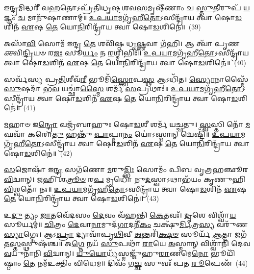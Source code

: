 {\anuvakamend[{𑌆 𑌤𑌿᳴\-\ul{𑌷𑍍𑌠} 𑌷𑌡𑍍𑌵𑌿𑍞᳴𑌶𑌤𑌿𑌃}]}%

𑌇\-\ul{𑌨𑍍𑌦𑍍𑌰}\-𑌮𑌿𑌦𑍍𑌧𑌰𑍀᳴ 𑌵\-\ul{𑌹}\-𑌤𑍋\-𑌽𑌪𑍍𑌰᳴𑌤𑌿𑌧𑍃𑌷𑍍𑌟𑌶𑌵\-\ul{𑌸}\-𑌮𑍃𑌷𑍀᳴𑌣𑌾𑌂 𑌚 \ul{𑌸𑍍𑌤𑍁}\-𑌤𑍀𑌰𑍁𑌪᳴ \ul{𑌯}\-𑌜𑍍𑌞𑌂 \ul{𑌚} 𑌮𑌾𑌨𑍁᳴𑌷𑌾𑌣𑌾𑌮𑍍॥ \ul{𑌉}\-\-\ul{𑌪}\-\-\ul{𑌯𑌾}\-𑌮𑌗𑍃᳴𑌹𑍀\-\ul{𑌤𑍋}\-\-𑌽𑌸𑍀𑌨𑍍𑌦𑍍𑌰𑌾᳴𑌯 𑌤𑍍𑌵𑌾 𑌷𑍋\-\ul{𑌡}\-𑌶𑌿𑌨᳴ \ul{𑌏}\-𑌷 \ul{𑌤𑍇} 𑌯𑍋\-\ul{𑌨𑌿}\-𑌰𑌿𑌨𑍍𑌦𑍍𑌰𑌾᳴𑌯 𑌤𑍍𑌵𑌾 𑌷𑍋\-\ul{𑌡}\-𑌶𑌿𑌨𑍇॑॥~(39)

{\anuvakamend[{𑌇\-\ul{𑌨𑍍𑌦𑍍𑌰}\-𑌮𑌿𑌤𑍍𑌤𑍍𑌰𑌯𑍋᳴𑌵𑌿𑍞𑌶𑌤𑌿𑌃}]}%

𑌅𑌸𑌾᳴\-\ul{𑌵𑌿} 𑌸𑍋𑌮᳴ 𑌇𑌨𑍍𑌦𑍍𑌰 \ul{𑌤𑍇} 𑌶𑌵𑌿᳴𑌷𑍍𑌠 𑌧𑍃\-\ul{𑌷𑍍𑌣}\-𑌵𑌾 𑌗᳴𑌹𑌿। 𑌆 𑌤𑍍𑌵𑌾᳴ 𑌪𑍃𑌣𑌕𑍍𑌤𑍍𑌵𑌿\-\ul{𑌨𑍍𑌦𑍍𑌰𑌿}\-𑌯𑍞 𑌰\-\ul{𑌜𑌃} 𑌸𑍂\-\ul{𑌰𑍍𑌯𑌂} 𑌨 \ul{𑌰}\-𑌶𑍍𑌮𑌿𑌭𑌿𑌃᳴॥ \ul{𑌉}\-\-\ul{𑌪}\-\-\ul{𑌯𑌾}\-𑌮𑌗𑍃᳴𑌹𑍀\-\ul{𑌤𑍋}\-\-𑌽𑌸𑍀𑌨𑍍𑌦𑍍𑌰𑌾᳴𑌯 𑌤𑍍𑌵𑌾 𑌷𑍋\-\ul{𑌡}\-𑌶𑌿𑌨᳴ \ul{𑌏}\-𑌷 \ul{𑌤𑍇} 𑌯𑍋\-\ul{𑌨𑌿}\-𑌰𑌿𑌨𑍍𑌦𑍍𑌰𑌾᳴𑌯 𑌤𑍍𑌵𑌾 𑌷𑍋\-\ul{𑌡}\-𑌶𑌿𑌨𑍇॑॥~(40)

{\anuvakamend[{𑌅𑌸𑌾᳴𑌵𑌿 \ul{𑌸}\-𑌪𑍍𑌤𑌵𑌿𑍞᳴𑌶𑌤𑌿𑌃}]}%

𑌸𑌰𑍍𑌵᳴𑌸𑍍𑌯 𑌪𑍍𑌰\-\ul{𑌤𑌿}\-𑌶𑍀𑌵᳴\-\ul{𑌰𑍀} 𑌭𑍂𑌮𑌿᳴\-\ul{𑌸𑍍𑌤𑍍𑌵𑍋}\-𑌪\-\ul{𑌸𑍍𑌥} 𑌆\-𑌽𑌧𑌿᳴𑌤। \ul{𑌸𑍍𑌯𑍋}\-𑌨𑌾𑌸𑍍𑌮𑍈᳴ \ul{𑌸𑍁}\-𑌷𑌦𑌾᳴ 𑌭\-\ul{𑌵} 𑌯𑌚𑍍𑌛𑌾॑\-\ul{𑌸𑍍𑌮𑍈} 𑌶𑌰𑍍𑌮᳴ \ul{𑌸}\-𑌪𑍍𑌰𑌥𑌾𑌃॑॥ \ul{𑌉}\-\-\ul{𑌪}\-\-\ul{𑌯𑌾}\-𑌮𑌗𑍃᳴𑌹𑍀\-\ul{𑌤𑍋}\-\-𑌽𑌸𑍀𑌨𑍍𑌦𑍍𑌰𑌾᳴𑌯 𑌤𑍍𑌵𑌾 𑌷𑍋\-\ul{𑌡}\-𑌶𑌿𑌨᳴ \ul{𑌏}\-𑌷 \ul{𑌤𑍇} 𑌯𑍋\-\ul{𑌨𑌿}\-𑌰𑌿𑌨𑍍𑌦𑍍𑌰𑌾᳴𑌯 𑌤𑍍𑌵𑌾 𑌷𑍋\-\ul{𑌡}\-𑌶𑌿𑌨𑍇॑॥~(41)

{\anuvakamend[{𑌸𑌰𑍍𑌵᳴\-\ul{𑌸𑍍𑌯} 𑌷𑌡𑍍𑌵𑌿𑍞᳴𑌶𑌤𑌿𑌃}]}%

\-\ul{𑌮}\-𑌹𑌾𑍞 𑌇\-\ul{𑌨𑍍𑌦𑍍𑌰𑍋} 𑌵𑌜𑍍𑌰᳴𑌬𑌾𑌹𑍁𑌃 𑌷𑍋\-\ul{𑌡}\-𑌶𑍀 𑌶𑌰𑍍𑌮᳴ 𑌯𑌚𑍍𑌛𑌤𑍁। \ul{𑌸𑍍𑌵}\-𑌸𑍍𑌤𑌿 𑌨𑍋᳴ \ul{𑌮}\-𑌘𑌵𑌾᳴ 𑌕𑌰𑍋\-\ul{𑌤𑍁} 𑌹𑌨𑍍𑌤𑍁᳴ \ul{𑌪𑌾}\-𑌪𑍍𑌮𑌾\-\ul{𑌨𑌂} 𑌯𑍋॑\-𑌽𑌸𑍍𑌮𑌾𑌨𑍍 𑌦𑍍𑌵𑍇𑌷𑍍𑌟𑌿᳴॥ \ul{𑌉}\-\-\ul{𑌪}\-\-\ul{𑌯𑌾}\-𑌮𑌗𑍃᳴𑌹𑍀\-\ul{𑌤𑍋}\-\-𑌽𑌸𑍀𑌨𑍍𑌦𑍍𑌰𑌾᳴𑌯 𑌤𑍍𑌵𑌾 𑌷𑍋\-\ul{𑌡}\-𑌶𑌿𑌨᳴ \ul{𑌏}\-𑌷 \ul{𑌤𑍇} 𑌯𑍋\-\ul{𑌨𑌿}\-𑌰𑌿𑌨𑍍𑌦𑍍𑌰𑌾᳴𑌯 𑌤𑍍𑌵𑌾 𑌷𑍋\-\ul{𑌡}\-𑌶𑌿𑌨𑍇॑॥~(42)

{\anuvakamend[{𑌸𑌰𑍍𑌵᳴𑌸𑍍𑌯 \ul{𑌮}\-𑌹𑌾𑌨𑍍𑌥𑍍𑌷𑌡𑍍𑌵𑌿𑍞᳴𑌶\-\ul{𑌤𑌿𑌃} 𑌷𑌡𑍍𑌵𑌿𑍞᳴𑌶𑌤𑌿𑌃}]}%

\-\ul{𑌸}\-𑌜𑍋𑌷𑌾᳴ 𑌇\-\ul{𑌨𑍍𑌦𑍍𑌰} 𑌸𑌗᳴𑌣𑍋 \ul{𑌮}\-𑌰𑍁\-\ul{𑌦𑍍𑌭𑌿𑌃} 𑌸𑍋𑌮𑌂᳴ 𑌪𑌿𑌬 𑌵𑍃𑌤𑍍𑌰𑌹𑌞𑍍𑌛𑍂𑌰 \ul{𑌵𑌿}\-𑌦𑍍𑌵𑌾𑌨𑍍। \ul{𑌜}\-𑌹𑌿 𑌶\-\ul{𑌤𑍍𑌰𑍂}\-\-\ul{𑍞} 𑌰\-\ul{𑌪} 𑌮𑍃𑌧𑍋᳴ 𑌨𑍁\-\ul{𑌦}\-𑌸𑍍𑌵𑌾\-𑌽𑌥𑌾𑌭᳴𑌯𑌂 𑌕𑍃𑌣𑍁𑌹𑌿 \ul{𑌵𑌿}\-𑌶𑍍𑌵𑌤𑍋᳴ 𑌨𑌃॥ \ul{𑌉}\-\-\ul{𑌪}\-\-\ul{𑌯𑌾}\-𑌮𑌗𑍃᳴𑌹𑍀\-\ul{𑌤𑍋}\-\-𑌽𑌸𑍀𑌨𑍍𑌦𑍍𑌰𑌾᳴𑌯 𑌤𑍍𑌵𑌾 𑌷𑍋\-\ul{𑌡}\-𑌶𑌿𑌨᳴ \ul{𑌏}\-𑌷 \ul{𑌤𑍇} 𑌯𑍋\-\ul{𑌨𑌿}\-𑌰𑌿𑌨𑍍𑌦𑍍𑌰𑌾᳴𑌯 𑌤𑍍𑌵𑌾 𑌷𑍋\-\ul{𑌡}\-𑌶𑌿𑌨𑍇॑॥~(43)

{\anuvakamend[{\-\ul{𑌸}\-𑌜𑍋𑌷𑌾॑\-\ul{𑌸𑍍𑌤𑍍𑌰𑌿}\-\-\ul{𑍞}\-𑌶𑌤𑍍}]}%

𑌉\-\ul{𑌦𑍁} 𑌤𑍍𑌯𑌂 \ul{𑌜𑌾}\-𑌤𑌵𑍇᳴𑌦𑌸𑌂 \ul{𑌦𑍇}\-𑌵𑌂 𑌵᳴𑌹𑌨𑍍𑌤𑌿 \ul{𑌕𑍇}\-𑌤𑌵𑌃᳴। \ul{𑌦𑍃}\-𑌶𑍇 𑌵𑌿𑌶𑍍𑌵𑌾᳴\-\ul{𑌯} 𑌸𑍂𑌰𑍍𑌯𑌮𑍍॑॥ \ul{𑌚𑌿}\-𑌤𑍍𑌰𑌂 \ul{𑌦𑍇}\-𑌵𑌾\-\ul{𑌨𑌾}\-𑌮𑍁𑌦᳴\-\ul{𑌗𑌾}\-𑌦𑌨𑍀᳴\-\ul{𑌕𑌂} 𑌚𑌕𑍍𑌷𑍁᳴\-\ul{𑌰𑍍𑌮𑌿}\-𑌤𑍍𑌰\-\ul{𑌸𑍍𑌯} 𑌵𑌰𑍁᳴𑌣\-\ul{𑌸𑍍𑌯𑌾}\-𑌗𑍍𑌨𑍇𑌃। 𑌆\-𑌽\-\ul{𑌪𑍍𑌰𑌾} 𑌦𑍍𑌯𑌾𑌵𑌾᳴𑌪𑍃\-\ul{𑌥𑌿}\-𑌵𑍀 \ul{𑌅}\-𑌨𑍍𑌤𑌰𑌿᳴\-\ul{𑌕𑍍𑌷}\-\-\ul{𑍞} 𑌸𑍂𑌰𑍍𑌯᳴ \ul{𑌆}\-𑌤𑍍𑌮𑌾 𑌜𑌗᳴𑌤\-\ul{𑌸𑍍𑌤}\-𑌸𑍍𑌥𑍁𑌷᳴𑌶𑍍𑌚॥ 𑌅\-\ul{𑌗𑍍𑌨𑍇} 𑌨𑌯᳴ \ul{𑌸𑍁}\-𑌪𑌥𑌾᳴ \ul{𑌰𑌾}\-𑌯𑍇 \ul{𑌅}\-𑌸𑍍𑌮𑌾𑌨𑍍 𑌵𑌿𑌶𑍍𑌵𑌾᳴𑌨𑌿 𑌦𑍇𑌵 \ul{𑌵}\-𑌯𑍁𑌨𑌾᳴𑌨𑌿 \ul{𑌵𑌿}\-𑌦𑍍𑌵𑌾𑌨𑍍। \ul{𑌯𑍁}\-\-\ul{𑌯𑍋}\-𑌧𑍍𑌯᳴𑌸𑍍𑌮𑌜𑍍𑌜𑍁᳴𑌹𑍁\-\ul{𑌰𑌾}\-𑌣𑌮𑍇\-\ul{𑌨𑍋} 𑌭𑍂𑌯𑌿᳴𑌷𑍍𑌠𑌾𑌂 \ul{𑌤𑍇} 𑌨𑌮᳴𑌉𑌕𑍍𑌤𑌿𑌂 𑌵𑌿𑌧𑍇𑌮॥ 𑌦𑌿𑌵𑌂᳴ 𑌗\-\ul{𑌚𑍍𑌛} 𑌸𑍁𑌵𑌃᳴ 𑌪𑌤 \ul{𑌰𑍂}\-𑌪𑍇𑌣᳴~(44)

